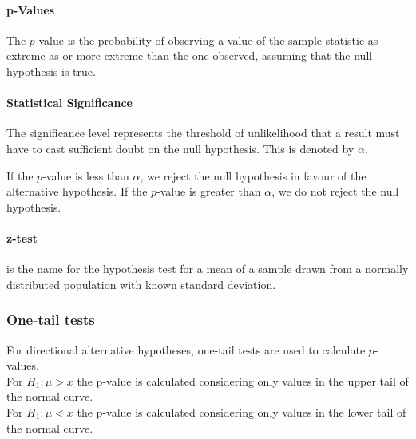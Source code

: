 \documentclass[a4paper,twoside,10pt]{article}
\begin{document}
			\paragraph{p-Values} The $p$ value is the probability of observing a value of the sample statistic as extreme as or more extreme than the one observed, assuming that the null hypothesis is true.
			
			\paragraph{Statistical Significance} The significance level represents the threshold of unlikelihood that a result must have to cast sufficient doubt on the null hypothesis. This is denoted by $\alpha$.
			
			If the $p$-value is less than $\alpha$, we reject the null hypothesis in favour of the alternative hypothesis. If the $p$-value is greater than $\alpha$, we do not reject the null hypothesis.
			
			\paragraph{z-test} is the name for the hypothesis test for a mean of a sample drawn from a normally distributed population with known standard deviation.
			
			\subsubsection{One-tail tests}
				For directional alternative hypotheses, one-tail tests are used to calculate $p$-values.\\
				For $H_1:\mu>x$ the p-value is calculated considering only values in the upper tail of the normal curve.\\
				For $H_1:\mu<x$ the p-value is calculated considering only values in the lower tail of the normal curve.\\
\end{document}
